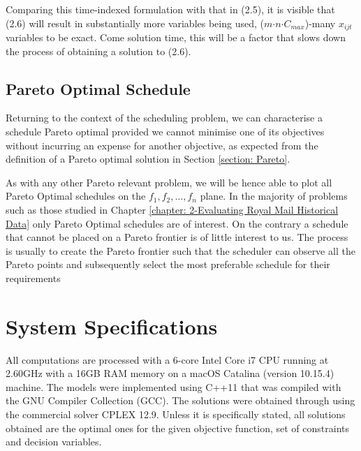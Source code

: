 \vspace{\baselineskip}
\noindent
Comparing this time-indexed formulation with that in (2.5), it is visible that (2.6) will result in substantially more variables being used, ($m$$\cdot$$n$$\cdot$$C_{max}$)-many $x_{ijt}$ variables to be exact. Come solution time, this will be a factor that slows down the process of obtaining a solution to (2.6).
\vspace{\baselineskip}


\subsection*{Pareto Optimal Schedule}
Returning to the context of the scheduling problem, we can characterise a schedule Pareto optimal provided we cannot minimise one of its objectives without
incurring an expense for another objective, as expected from the definition of a Pareto optimal solution in Section \ref{section: Pareto}.

\vspace{\baselineskip}
\noindent
As with any other Pareto relevant problem, we will be hence able to plot all Pareto Optimal schedules on the $f_1,f_2,\ldots,f_n$ plane. In the majority of problems such as those studied in Chapter \ref{chapter: 2-Evaluating Royal Mail Historical Data} only Pareto Optimal schedules are of interest. On the contrary a schedule that cannot be placed on a Pareto frontier is of little interest to us. The process is usually to create the Pareto frontier such that the scheduler can observe all the Pareto points and subsequently select the most preferable schedule for their requirements

\section{System Specifications}
All computations are processed with a 6-core Intel Core i7 CPU running at 2.60GHz with a 16GB RAM memory on a macOS Catalina (version 10.15.4) machine. The models were implemented using C++11 that was compiled with the GNU Compiler Collection (GCC). The solutions were obtained through using the commercial solver CPLEX 12.9. Unless it is specifically stated, all solutions obtained are the optimal ones for the given objective function, set of constraints and decision variables.   


\vspace{\baselineskip}

\vspace{\baselineskip}

\vspace{\baselineskip}

\vspace{\baselineskip}
